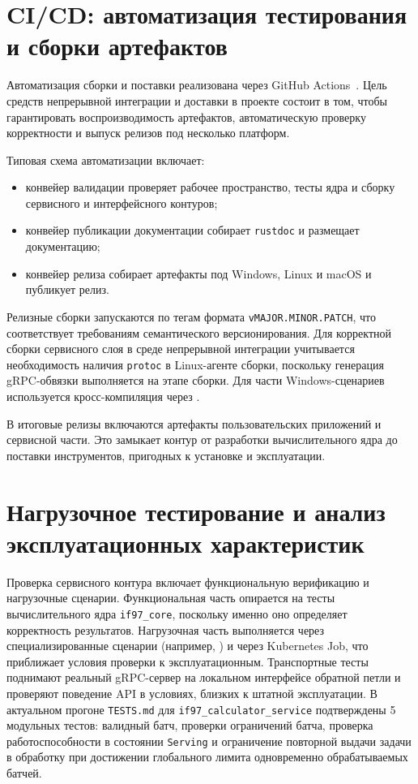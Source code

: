\section{CI/CD: автоматизация тестирования и сборки артефактов}

Автоматизация сборки и поставки реализована через GitHub Actions~\cite{github_actions_docs}.  
Цель средств непрерывной интеграции и доставки в проекте состоит в том, чтобы гарантировать воспроизводимость артефактов, автоматическую проверку корректности и выпуск релизов под несколько платформ.  

Типовая схема автоматизации включает:
\begin{itemize}
\item конвейер валидации проверяет рабочее пространство, тесты ядра и сборку сервисного и интерфейсного контуров;  
\item конвейер публикации документации собирает \texttt{rustdoc} и размещает документацию;  
\item конвейер релиза собирает артефакты под Windows, Linux и macOS и публикует релиз.  
\end{itemize}

Релизные сборки запускаются по тегам формата \texttt{vMAJOR.MINOR.PATCH},
что соответствует требованиям семантического версионирования.  
Для корректной сборки сервисного слоя в среде непрерывной интеграции учитывается необходимость наличия \texttt{protoc} в Linux-агенте сборки, поскольку генерация gRPC-обвязки выполняется на этапе сборки.  
Для части Windows-сценариев используется кросс-компиляция через .  

В итоговые релизы включаются артефакты пользовательских приложений и сервисной части.  
Это замыкает контур от разработки вычислительного ядра до поставки инструментов, пригодных к установке и эксплуатации.  

\section{Нагрузочное тестирование и анализ эксплуатационных характеристик}

Проверка сервисного контура включает функциональную верификацию и нагрузочные сценарии.  
Функциональная часть опирается на тесты вычислительного ядра \texttt{if97\_core}, поскольку именно оно определяет корректность результатов.  
Нагрузочная часть выполняется через специализированные сценарии
(например, )
и через Kubernetes Job,
что приближает условия проверки к эксплуатационным.  
Транспортные тесты поднимают реальный gRPC-сервер
на локальном интерфейсе обратной петли
и проверяют поведение API в условиях,
близких к штатной эксплуатации.
В актуальном прогоне \texttt{TESTS.md}
для \texttt{if97\_calculator\_service}
подтверждены 5 модульных тестов:
валидный батч, проверки ограничений батча,
проверка работоспособности в состоянии \texttt{Serving}
и ограничение повторной выдачи задачи в обработку
при достижении глобального лимита одновременно обрабатываемых батчей.

